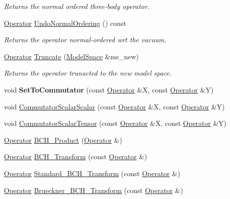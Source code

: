 \begin{DoxyCompactItemize}
\begin{DoxyCompactList}\small\item\em Returns the normal ordered three-\/body operator. \end{DoxyCompactList}\item 
\hyperlink{classOperator}{Operator} \hyperlink{classOperator_a24a5d005bdf2d04d4cdb6f009a901eca}{Undo\+Normal\+Ordering} () const
\begin{DoxyCompactList}\small\item\em Returns the operator normal-\/ordered wrt the vacuum. \end{DoxyCompactList}\item 
\hyperlink{classOperator}{Operator} \hyperlink{classOperator_ac2eb154c97ceff6f86cd3d24ddb4da1f}{Truncate} (\hyperlink{classModelSpace}{Model\+Space} \&ms\+\_\+new)
\begin{DoxyCompactList}\small\item\em Returns the operator trunacted to the new model space. \end{DoxyCompactList}\item 
\mbox{\label{classOperator_afeebc062fa99c993e65e46a99b1008d7}} 
void {\bfseries Set\+To\+Commutator} (const \hyperlink{classOperator}{Operator} \&X, const \hyperlink{classOperator}{Operator} \&Y)
\item 
void \hyperlink{classOperator_a93daa0fe076a64408773a65d66c6f14d}{Commutator\+Scalar\+Scalar} (const \hyperlink{classOperator}{Operator} \&X, const \hyperlink{classOperator}{Operator} \&Y)
\item 
void \hyperlink{classOperator_a07b286db306e5bb11c6d897bc3a199c8}{Commutator\+Scalar\+Tensor} (const \hyperlink{classOperator}{Operator} \&X, const \hyperlink{classOperator}{Operator} \&Y)
\item 
\hyperlink{classOperator}{Operator} \hyperlink{classOperator_a6a91cd02db723ee28b7532e6af029033}{B\+C\+H\+\_\+\+Product} (\hyperlink{classOperator}{Operator} \&)
\item 
\hyperlink{classOperator}{Operator} \hyperlink{classOperator_a9a2d6b13d851f2655f3ef88033a24c5b}{B\+C\+H\+\_\+\+Transform} (const \hyperlink{classOperator}{Operator} \&)
\item 
\hyperlink{classOperator}{Operator} \hyperlink{classOperator_a9deea6699c1d3d39119bedeb1f53965e}{Standard\+\_\+\+B\+C\+H\+\_\+\+Transform} (const \hyperlink{classOperator}{Operator} \&)
\item 
\hyperlink{classOperator}{Operator} \hyperlink{classOperator_a088a5326a1c82e520b8bcdd4dc25175a}{Brueckner\+\_\+\+B\+C\+H\+\_\+\+Transform} (const \hyperlink{classOperator}{Operator} \&)

\end{DoxyCompactItemize}
